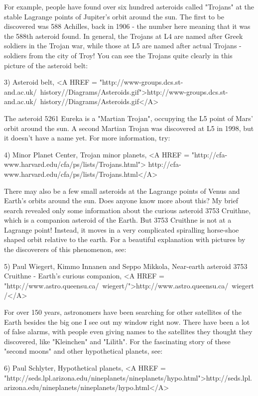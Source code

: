 For example, people have found over six hundred asteroids called 
"Trojans" 
at the stable Lagrange points of Jupiter's orbit around the sun.  The 
first to be discovered was 588 Achilles, back in 1906 - the number here 
meaning that it was the 588th asteroid found.  In general, the Trojans 
at L4 are named after Greek soldiers in the Trojan war, while those at 
L5 are named after actual Trojans - soldiers from the city of Troy!  You
can see the Trojans quite clearly in this picture of the asteroid belt:

3) Asteroid belt,
<A HREF = "http://www-groups.dcs.st-and.ac.uk/~history//Diagrams/Asteroids.gif">http://www-groups.dcs.st-and.ac.uk/~history//Diagrams/Asteroids.gif</A>

The asteroid 5261 Eureka is a "Martian Trojan", occupying the
L5 point of Mars' orbit around the sun.  A second Martian Trojan was 
discovered at L5 in 1998, but it doesn't have a name yet.  For more 
information, try:

4) Minor Planet Center, Trojan minor planets, 
<A HREF = "http://cfa-www.harvard.edu/cfa/ps/lists/Trojans.html">
http://cfa-www.harvard.edu/cfa/ps/lists/Trojans.html</A>

There may also be a few small asteroids at the Lagrange points of 
Venus and Earth's orbits around the sun.  Does anyone know more 
about this?   My brief search revealed only some information about 
the curious asteroid 3753 Cruithne, which is a companion asteroid 
of the Earth.  But 3753 Cruithne is not at a Lagrange point!  Instead, 
it moves in a very complicated spiralling horse-shoe shaped orbit 
relative to the earth.  For a beautiful explanation with pictures 
by the discoverers of this phenomenon, see:

5) Paul Wiegert, Kimmo Innanen and Seppo Mikkola, Near-earth asteroid
3753 Cruithne - Earth's curious companion, 
<A HREF = "http://www.astro.queensu.ca/~wiegert/">http://www.astro.queensu.ca/~wiegert/</A>

For over 150 years, astronomers have been searching for other satellites
of the Earth besides the big one I see out my window right now.  There
have been a lot of false alarms, with people even giving names to the
satellites they thought they discovered, like "Kleinchen" and "Lilith".
For the fascinating story of these "second moons" and other hypothetical
planets, see:

6) Paul Schlyter, Hypothetical planets,
<A HREF = "http://seds.lpl.arizona.edu/nineplanets/nineplanets/hypo.html">http://seds.lpl.arizona.edu/nineplanets/nineplanets/hypo.html</A>

